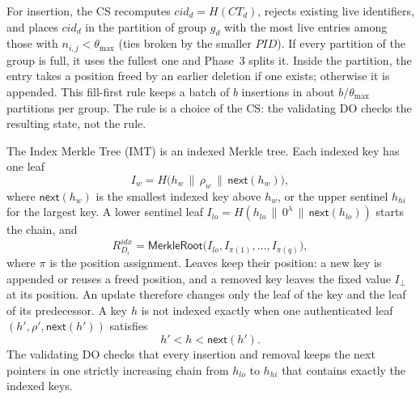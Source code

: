 For insertion, the CS recomputes $cid_d = H(CT_d)$, rejects existing live identifiers, and places
$cid_d$ in the partition of group $g_d$ with the most live entries among those with
$n_{i,j} < \theta_{\max}$ (ties broken by the smaller $PID$). If every partition of the group is full,
it uses the fullest one and Phase~3 splits it. Inside the partition, the entry takes a position freed
by an earlier deletion if one exists; otherwise it is appended. This fill-first rule keeps a batch of
$b$ insertions in about $b/\theta_{\max}$ partitions per group. The rule is a choice of the CS:
the validating DO checks the resulting state, not the rule.



The Index Merkle Tree (IMT) is an indexed Merkle tree. Each indexed key has one leaf
\begin{equation}
I_w = H\big(h_w \,\|\, \rho_w \,\|\, \mathsf{next}(h_w)\big),
\end{equation}
where $\mathsf{next}(h_w)$ is the smallest indexed key above $h_w$, or the upper sentinel $h_{hi}$
for the largest key. A lower sentinel leaf $I_{lo} = H(h_{lo} \,\|\, 0^{\lambda} \,\|\, \mathsf{next}(h_{lo}))$
starts the chain, and
\begin{equation}
R^{idx}_{D_i} = \mathsf{MerkleRoot}\big(I_{lo}, I_{\pi(1)}, \dots, I_{\pi(q)}\big),
\end{equation}
where $\pi$ is the position assignment. Leaves keep their position: a new key is appended or reuses a
freed position, and a removed key leaves the fixed value $I_{\bot}$ at its position. An update therefore
changes only the leaf of the key and the leaf of its predecessor. A key $h$ is not indexed exactly when
one authenticated leaf $(h', \rho', \mathsf{next}(h'))$ satisfies
\begin{equation}
h' < h < \mathsf{next}(h').
\end{equation}
The validating DO checks that every insertion and removal keeps the next pointers in one strictly
increasing chain from $h_{lo}$ to $h_{hi}$ that contains exactly the indexed keys.


